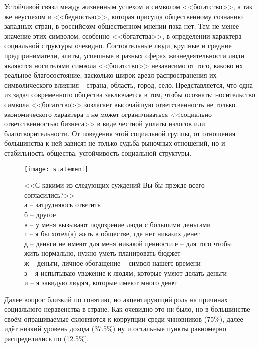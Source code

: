 Устойчивой связи между жизненным успехом и символом <<богатство>>, а так же 
неуспехом и <<бедностью>>, которая присуща общественному сознанию западных 
стран, в российском общественном мнении пока нет. Тем не менее значение этих 
символом, особенно <<богатства>>, в определении характера социальной структуры 
очевидно. Состоятельные люди, крупные и средние предприниматели, элиты, 
успешные в разных сферах жизнедеятельности люди являются носителями символа 
<<богатство>> независимо от того, каково их реальное благосостояние, насколько 
широк ареал распространения их символического влияния -- страна, область, 
город, село. Представляется, что одна из задач современного общества 
заключается в том, чтобы осознать: носительство символа <<богатство>> 
возлагает высочайшую ответственность не только экономического характера и не 
может ограничиваться <<социально ответственностью бизнеса>> в виде честной 
уплаты налогов или благотворительности. От поведения этой социальной группы, 
от отношения большинства к ней зависят не только судьба рыночных отношений, 
но и стабильность общества, устойчивость социальной структуры. 

\begin{figure}[H]
    \centering
    \texttt{[image: statement]} \\
    \caption{<<С какими из следующих суждений Вы бы прежде всего согласились?>> 
        \\
        а -- затрудняюсь ответить\\
        б -- другое \\
        в -- у меня вызывают подозрение люди с большими деньгами \\
        г -- я бы хотел(а) жить в обществе, где нет никаких денег \\
        д -- деньги не имеют для меня никакой ценности
        е -- для того чтобы жить нормально, нужно уметь планировать бюджет \\
        ж -- деньги, личное обогащение -- символ нашего времени \\
        з -- я испытываю уважение к людям, которые умеют делать деньги \\
        и -- я завидую людям, которые имеют много денег \\
    }
\end{figure}

Далее вопрос близкий по понятию, но акцентирующий роль на причинах социального 
неравенства в стране. Как очевидно это ни было, но в большинстве своём 
опрашиваемые склоняются к коррупции среди чиновников (75\%), далее идёт 
низкий уровень дохода (37.5\%) ну и остальные пункты равномерно распределились 
по (12.5\%).

